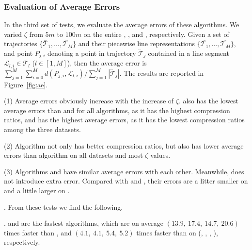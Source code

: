 \vspace{-0.5ex}
\subsubsection{Evaluation of Average Errors}
In the third set of tests, we evaluate the average errors of these algorithms.
We varied $\zeta$ from $5m$ to $100m$ on the entire \taxi, \truck, \sercar and \geolife, respectively.
Given a set of trajectories $\{\dddot{\mathcal{T}_1}, \ldots, \dddot{\mathcal{T}_M}\}$ and their piecewise line representations
$\{\overline{\mathcal{T}_1}, \ldots, \overline{\mathcal{T}_M}\}$, and point $P_{j,i}$ denoting
a point in trajectory $\dddot{\mathcal{T}}_j$ contained in a line segment $\mathcal{L}_{l,i}\in\overline{\mathcal{T}_l}$ ($l\in[1,M]$),
then the average error is $\sum_{j=1}^{M}\sum_{i=0}^{M} d(P_{j,i},
\mathcal{L}_{l,i})/\sum_{j=1}^{M}{|\dddot{\mathcal{T}}_j |}$.
The results are reported in Figure~\ref{fig:ae}.

\sstab(1) Average errors obviously increase with the increase of $\zeta$. \taxi also has the lowest average errors than \truck and \sercar for all algorithms,
as it has the highest compression ratios, and \sercar has the highest average errors, as it has the lowest compression ratios among the three datasets.

\sstab(2) Algorithm \dpa not only has better compression ratios, but also has lower average errors than algorithm \fbqsa on all datasets and most $\zeta$ values.

\sstab(3) Algorithms \operb and \operba have similar average errors with each other. Meanwhile, \operba does not introduce extra error. Compared with \dpa and \fbqsa, their errors are a litter smaller on \taxi and a little larger on \sercar.







.
From these tests we find the following.


\emph{}. \operb and \operba are the fastest algorithms, which are on average $(13.9, ~17.4, ~14.7, {~20.6})$ times faster than \dpa, and $(4.1,~4.1,~5.4, {~5.2})$
times faster than \fbqsa on (\taxi, \truck, \sercar, \geolife), respectively.

